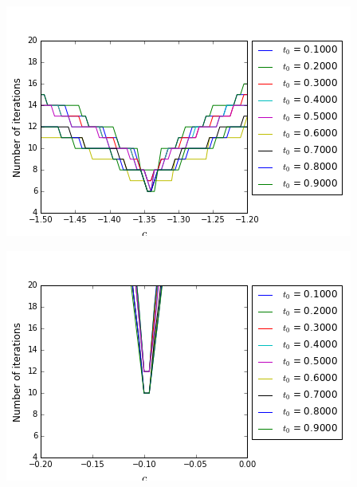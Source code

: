 \begin{minipage}{.5\linewidth}
\begin{center}
	\includegraphics[scale=.4]{figures/FinalFigures/NiterxCoefVarInterfaceFinalVersionNDetail.png}
\end{center}
\end{minipage}
\begin{minipage}{.5\linewidth}
\begin{center}
	\includegraphics[scale=.4]{figures/FinalFigures/NiterxCoefVarInterfaceFinalVersionNDetail2.png}
\end{center}
\end{minipage}
